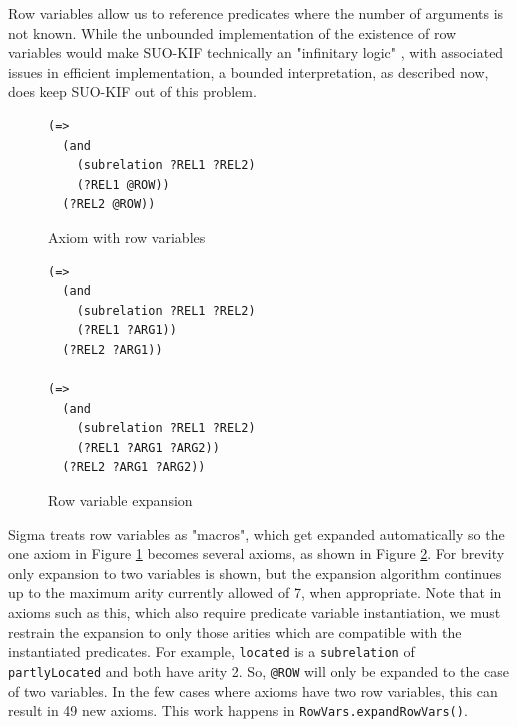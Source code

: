 \documentclass{book}
\begin{document}
\begin{sloppypar}
Row variables allow us to reference predicates where the
number of arguments is not known. While the unbounded implementation of the
existence of row variables would make SUO-KIF technically an "infinitary logic"
\cite{hayes2001}, with associated issues in efficient implementation, a bounded
interpretation, as described now, does keep SUO-KIF out of this problem.
\end{sloppypar}

\begin{figure}
\begin{framed}
\begin{verbatim}
(=>
  (and
    (subrelation ?REL1 ?REL2)
    (?REL1 @ROW))
  (?REL2 @ROW))
\end{verbatim}
\caption{Axiom with row variables}
\label{fig:RowVar}
\end{framed}
\end{figure}

\begin{figure}
\begin{framed}
\begin{verbatim}
(=>
  (and
    (subrelation ?REL1 ?REL2)
    (?REL1 ?ARG1))
  (?REL2 ?ARG1))

(=>
  (and
    (subrelation ?REL1 ?REL2)
    (?REL1 ?ARG1 ?ARG2))
  (?REL2 ?ARG1 ?ARG2))
\end{verbatim}
\caption{Row variable expansion}
\label{fig:RowExpand}
\end{framed}
\end{figure}

Sigma treats row variables as "macros", which get expanded
automatically so the one axiom in Figure \ref{fig:RowVar} becomes several
axioms, as shown in Figure \ref{fig:RowExpand}.  For brevity only expansion to
two variables is shown, but the expansion algorithm continues up to the maximum
arity currently allowed of 7, when appropriate.  Note that in axioms such as
this, which also require predicate variable instantiation, we must restrain the
expansion to only those arities which are compatible with the instantiated
predicates.  For example,  \texttt{located} is a
 \texttt{subrelation} of  {\tt
partlyLocated} and both have arity 2.  So, {\tt @ROW} will only be expanded to
the case of two variables. In the few cases where axioms have two row variables,
this can result in 49 new axioms.  This work happens in
\texttt{RowVars.expandRowVars()}.
\end{document}
